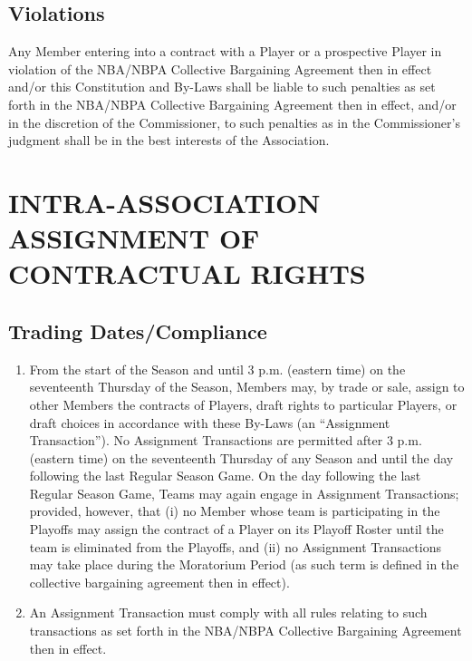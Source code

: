 \documentclass[]{book}
\providecommand{\tightlist}{%
  \setlength{\itemsep}{0pt}\setlength{\parskip}{0pt}}
\theoremstyle{definition}
\theoremstyle{definition}
\theoremstyle{definition}
\theoremstyle{remark}
\begin{document}
\subsection{Violations}\label{violations}

Any Member entering into a contract with a Player or a prospective
Player in violation of the NBA/NBPA Collective Bargaining Agreement then
in effect and/or this Constitution and By-Laws shall be liable to such
penalties as set forth in the NBA/NBPA Collective Bargaining Agreement
then in effect, and/or in the discretion of the Commissioner, to such
penalties as in the Commissioner's judgment shall be in the best
interests of the Association.

\section{INTRA-ASSOCIATION ASSIGNMENT OF CONTRACTUAL
RIGHTS}\label{intra-association-assignment-of-contractual-rights}

\subsection{Trading Dates/Compliance}\label{trading-datescompliance}

\begin{enumerate}
\def\labelenumi{(\alph{enumi})}
\tightlist
\item
  From the start of the Season and until 3 p.m. (eastern time) on the
  seventeenth Thursday of the Season, Members may, by trade or sale,
  assign to other Members the contracts of Players, draft rights to
  particular Players, or draft choices in accordance with these By-Laws
  (an ``Assignment Transaction''). No Assignment Transactions are
  permitted after 3 p.m. (eastern time) on the seventeenth Thursday of
  any Season and until the day following the last Regular Season Game.
  On the day following the last Regular Season Game, Teams may again
  engage in Assignment Transactions; provided, however, that (i) no
  Member whose team is participating in the Playoffs may assign the
  contract of a Player on its Playoff Roster until the team is
  eliminated from the Playoffs, and (ii) no Assignment Transactions may
  take place during the Moratorium Period (as such term is defined in
  the collective bargaining agreement then in effect).
\item
  An Assignment Transaction must comply with all rules relating to such
  transactions as set forth in the NBA/NBPA Collective Bargaining
  Agreement then in effect.
\end{enumerate}
\end{document}
